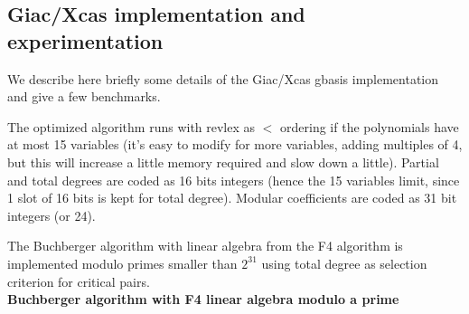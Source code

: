 \documentclass[a4paper,11pt]{article}
\begin{document}
\subsection{Giac/Xcas implementation and experimentation} \label{sec:giacf4}
We describe here briefly some details of the Giac/Xcas gbasis implementation
and give a few benchmarks.

The optimized algorithm runs with revlex as $<$ ordering
if the polynomials have at most 15
variables (it's easy to modify for more variables, adding multiples of
4, but this will increase a little memory required and
slow down a little).
Partial and total degrees are coded as 16 bits integers (hence the 15
variables limit, since 1 slot of 16 bits is kept for total degree). 
Modular coefficients are coded as 31 bit integers (or 24).

The Buchberger algorithm with linear algebra 
from the F4 algorithm is implemented modulo primes smaller than $2^{31}$
using total degree as selection criterion for critical pairs.\\
{\bf Buchberger algorithm with F4 linear algebra modulo a prime}
\end{document}
